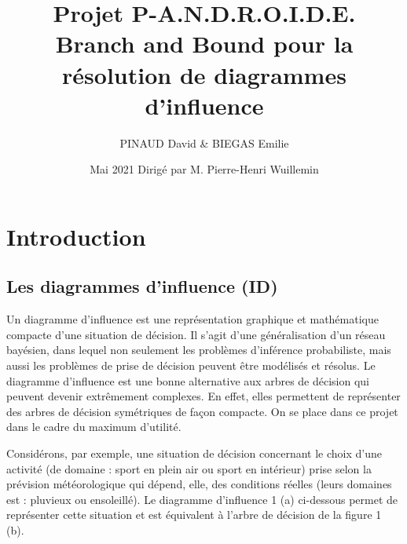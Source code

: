 \documentclass[12pt]{article}
\title{Projet P-A.N.D.R.O.I.D.E.\\
\bigbreak\textbf{Branch and Bound pour la résolution de diagrammes d'influence}}
\author{PINAUD David \& BIEGAS Emilie}
\date{Mai 2021 \bigbreak Dirigé par M. Pierre-Henri Wuillemin}
\affil{Université Sorbonne Sciences}
\begin{document}
\maketitle

\renewcommand{\contentsname}{Table des Matières}
\pagebreak
\tableofcontents
\pagebreak

\section{Introduction}

\subsection{Les diagrammes d'influence (ID)}
Un diagramme d'influence est une représentation graphique et mathématique compacte d'une situation de décision. Il s'agit d'une généralisation d'un réseau bayésien, dans lequel non seulement les problèmes d'inférence probabiliste, mais aussi les problèmes de prise de décision peuvent être modélisés et résolus. 
Le diagramme d'influence est une bonne alternative aux arbres de décision qui peuvent devenir extrêmement complexes. En effet, elles permettent de représenter des arbres de décision symétriques de façon compacte. On se place dans ce projet dans le cadre du maximum d'utilité.

Considérons, par exemple, une situation de décision concernant le choix d'une activité (de domaine : sport en plein air ou sport en intérieur) prise selon la prévision météorologique qui dépend, elle, des conditions réelles (leurs domaines est : pluvieux ou ensoleillé). Le diagramme d'influence 1 (a) ci-dessous permet de représenter cette situation et est équivalent à l'arbre de décision de la figure 1 (b).
\end{document}
